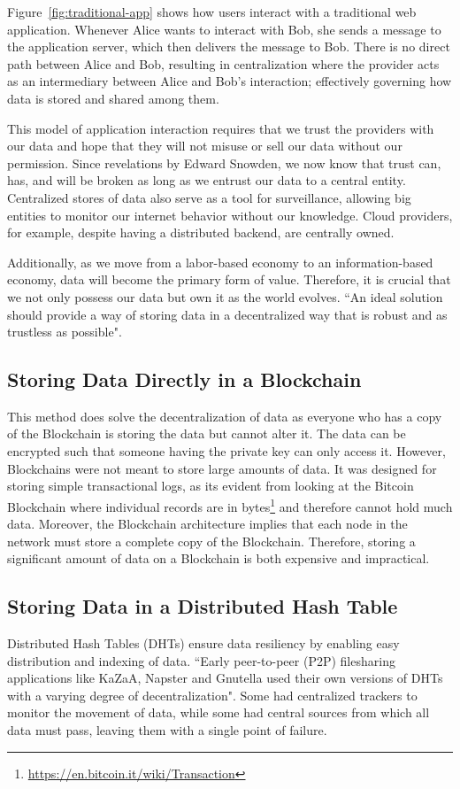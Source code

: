 	Figure~\ref{fig:traditional-app} shows how users interact with a traditional web application. Whenever Alice wants to interact with Bob, she sends a message to the application server, which then delivers the message to Bob. There is no direct path between Alice and Bob, resulting in centralization where the provider acts as an intermediary between Alice and Bob's interaction; effectively governing how data is stored and shared among them.
	
	This model of application interaction requires that we trust the providers with our data and hope that they will not misuse or sell our data without our permission. Since revelations by Edward Snowden\cite{greenwald2014no}, we now know that trust can, has, and will be broken as long as we entrust our data to a central entity\cite{raval2016decentralized}. Centralized stores of data also serve as a tool for surveillance, allowing big entities to monitor our internet behavior without our knowledge. Cloud providers, for example,  despite having a distributed backend, are centrally owned.
	
	Additionally, as we move from a labor-based economy to an information-based economy, data will become the primary form of value. Therefore, it is crucial that we not only possess our data but own it as the world evolves. ``An ideal solution should provide a way of storing data in a decentralized way that is robust and as trustless as possible"\cite{raval2016decentralized}.
	
	\subsection{Storing Data Directly in a Blockchain}
		This method does solve the decentralization of data as everyone who has a copy of the Blockchain is storing the data but cannot alter it. The data can be encrypted such that someone having the private key can only access it. However, Blockchains were not meant to store large amounts of data. It was designed for storing simple transactional logs, as its evident from looking at the Bitcoin Blockchain where individual records are in bytes\footnote{\url{https://en.bitcoin.it/wiki/Transaction}} and therefore cannot hold much data. Moreover, the Blockchain architecture implies that each node in the network must store a complete copy of the Blockchain. Therefore, storing a significant amount of data on a Blockchain is both expensive and impractical.
		
	\subsection{Storing Data in a Distributed Hash Table}
		Distributed Hash Tables (DHTs) ensure data resiliency by enabling easy distribution and indexing of data. ``Early peer-to-peer (P2P) filesharing applications like KaZaA\cite{good2003usability}, Napster\cite{ku2002creative} and Gnutella\cite{ripeanu2002mapping} used their own versions of DHTs with a varying degree of decentralization"\cite{raval2016decentralized}. Some had centralized trackers to monitor the movement of data, while some had central sources from which all data must pass, leaving them with a single point of failure\cite{raval2016decentralized}.
		
